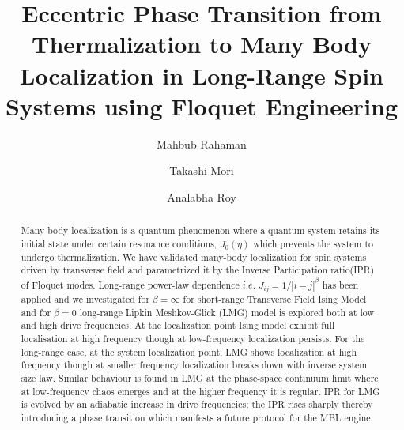 \documentclass[%
 reprint,
superscriptaddress,
 amsmath,amssymb,
 aps,
prb,
]{revtex4-2}
\begin{document}

\title{Eccentric Phase Transition from Thermalization to Many Body Localization  in Long-Range Spin Systems using Floquet Engineering}%

\author{Mahbub Rahaman}
\author{Takashi Mori}
\author{Analabha Roy}

\begin{abstract}
Many-body localization is a  quantum phenomenon where a quantum system retains its initial state under certain resonance conditions, $J_0(\eta)$ which prevents the system to undergo thermalization. We have validated many-body localization for spin systems driven by transverse field and parametrized it by the Inverse Participation ratio(IPR) of Floquet modes. Long-range power-law dependence $i.e.$ $J_{ij} = 1/|i-j|^{\beta}$ has been applied and we investigated for $\beta = \infty$ for short-range Transverse Field Ising Model and for  $\beta = 0$  long-range Lipkin Meshkov-Glick (LMG) model is explored both at low and high drive frequencies. At the localization point Ising model exhibit full localisation at  high frequency though at low-frequency localization persists. For the long-range case, at the system localization point, LMG shows localization at high frequency though at smaller frequency localization breaks down with inverse system size law. Similar behaviour is found in LMG at the phase-space continuum limit where at low-frequency chaos emerges and at the higher frequency it is regular. IPR for LMG is evolved by an adiabatic increase in drive frequencies; the IPR rises sharply  thereby introducing a phase transition which manifests a future protocol for the MBL engine.
 
\end{abstract}
\end{document}
